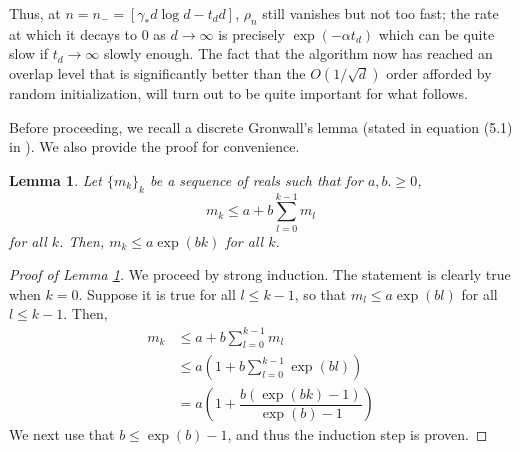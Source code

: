 \documentclass[12pt]{article}
\newtheorem{lemma}[theorem]{Lemma}      %
\def\gN{{\mathcal{N}}}
\begin{document}

\medskip

Thus, at $n=n_-=[\gamma_*d\log d - t_d d]$, $\rho_n$ still vanishes but not too fast; the rate at which it decays to $0$ as $d\to\infty$ is precisely $\exp(-\alpha t_d)$ which can be quite slow if $t_d\to\infty$ slowly enough. The fact that the algorithm now has reached an overlap level that is significantly better than the $O(1/\sqrt{d})$ order afforded by random initialization, will turn out to be quite important for what follows.

\medskip

Before proceeding, we recall a discrete Gronwall's lemma (stated in equation (5.1) in \citet{arous2021online}). We also provide the proof for convenience.

\medskip

\begin{lemma}\label{lemma:gronwall}
    Let $\{m_k\}_k$ be a sequence of reals such that for $a,b.\geq 0$, $$m_k\leq a + b\sum_{l=0}^{k-1}m_l$$ for all $k$. Then, $m_k\leq a\exp(bk)$ for all $k$.
\end{lemma}

\begin{proof}[Proof of Lemma \ref{lemma:gronwall}]
    We proceed by strong induction. The statement is clearly true when $k=0$. Suppose it is true for all $l\leq k-1$, so that $m_l\leq a\exp(bl)$ for all $l\leq k-1$. Then, 
    \begin{align*}
        m_k &\leq a + b\sum_{l=0}^{k-1}m_l\\
        &\leq a\left(1 + b\sum_{l=0}^{k-1}\exp(bl)\right)\\
        &= a\left(1 + \dfrac{b(\exp(bk)-1)}{\exp(b)-1}\right)
    \end{align*}We next use that $b\leq \exp(b)-1$, and thus the induction step is proven.
\end{proof}
\end{document}
